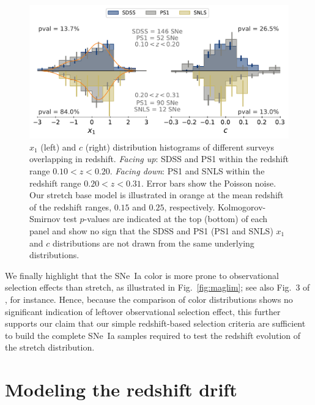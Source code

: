 \documentclass[]{aa}
\begin{document}
\begin{figure}
    \centering
    \includegraphics[width=0.95\linewidth]{Article_figures/both-cut_SDSS_SNLS_PS1.pdf}
    \caption{$x_1$ (left) and $c$ (right) distribution histograms of
            different surveys overlapping in redshift. \textit{Facing up}: SDSS
            and PS1 within the redshift range $0.10 < z < 0.20$. \textit{Facing
            down}: PS1 and SNLS within the redshift range $0.20 < z < 0.31$.
            Error bars show the Poisson noise. Our stretch base model is
            illustrated in orange at the mean redshift of the redshift ranges,
            $0.15$ and $0.25$, respectively. Kolmogorov-Smirnov test $p$-values
            are indicated at the top (bottom) of each panel and show no
            sign that the SDSS and PS1 (PS1 and SNLS) $x_1$ and $c$
            distributions are not drawn from the same underlying
    distributions.}
    \label{fig:distrib}
\end{figure}

We finally highlight that the SNe~Ia color is more prone to observational
selection effects than stretch, as illustrated in Fig.~\ref{fig:maglim}; see
also Fig.~3 of \cite{kessler2017}, for instance. Hence, because the comparison
of color distributions shows no significant indication of leftover observational
selection effect, this further supports our claim that our simple redshift-based
selection criteria are sufficient to build the complete SNe~Ia samples required
to test the redshift evolution of the stretch distribution.

\section{Modeling the redshift drift}\label{sec:modeling}
\end{document}

